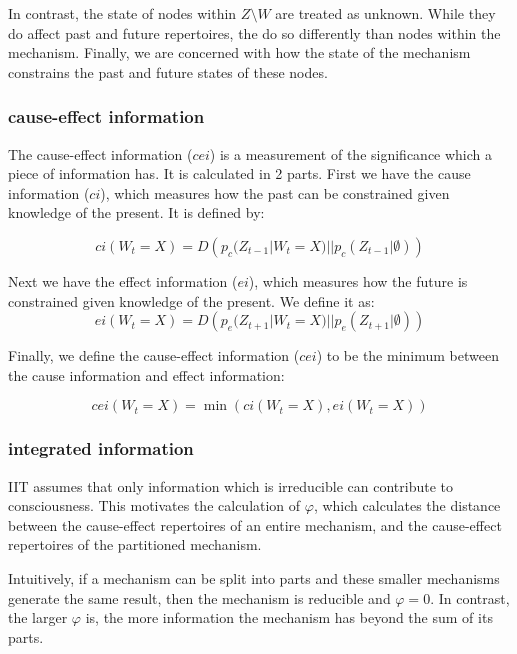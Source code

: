 In contrast, the state of nodes within $Z \setminus W$ are treated as unknown. While they do affect past and future repertoires, the do so differently than nodes within the mechanism. Finally, we are concerned with how the state of the mechanism constrains the past and future states of these nodes.

\subsubsection{cause-effect information}
The cause-effect information ($cei$) is a measurement of the significance which a piece of information has. It is calculated in 2 parts. First we have the cause information ($ci$), which measures how the past can be constrained given knowledge of the present. It is defined by:

\begin{equation}
\label{def:ci}
ci(W_{t} = X) = D\left(p_c(Z_{t-1}|W_{t} = X)||p_c(Z_{t-1}|\emptyset)\right)
\end{equation}


Next we have the effect information ($ei$), which measures how the future is constrained given knowledge of the present. We define it as:
\begin{equation}
\label{def:ei}
ei(W_{t} = X) = D\left(p_e(Z_{t+1}|W_{t} = X)||p_{e}(Z_{t+1}|\emptyset)\right)
\end{equation}

Finally, we define the cause-effect information ($cei$) to be the minimum between the cause information and effect information:

\begin{equation}
\label{def:cei}
cei(W_{t} = X) = \min\left(ci(W_{t} = X), ei(W_{t} = X) \right)
\end{equation}

\subsubsection{integrated information}
\label{sec:mech_integration}
IIT assumes that only information which is irreducible can contribute to consciousness. This motivates the calculation of $\varphi$, which calculates the distance between the cause-effect repertoires of an entire mechanism, and the cause-effect repertoires of the partitioned mechanism. 

Intuitively, if a mechanism can be split into parts and these smaller mechanisms generate the same result, then the mechanism is reducible and $\varphi=0$. In contrast, the larger $\varphi$ is, the more information the mechanism has beyond the sum of its parts.

